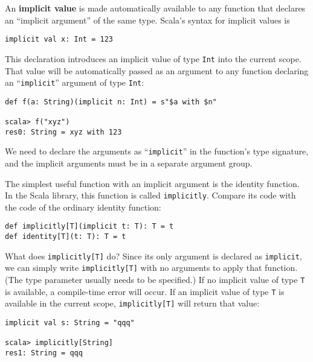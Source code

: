 An \textbf{implicit value} is made automatically
available to any function that declares an ``implicit argument''
of the same type. Scala's syntax for implicit values is
\begin{lstlisting}
implicit val x: Int = 123
\end{lstlisting}
This declaration introduces an implicit value of type \lstinline!Int!
into the current scope. That value will be automatically passed as
an argument to any function declaring an ``\lstinline!implicit!''
argument of type \lstinline!Int!:
\begin{lstlisting}
def f(a: String)(implicit n: Int) = s"$a with $n"

scala> f("xyz")
res0: String = xyz with 123
\end{lstlisting}
We need to declare the arguments as ``\lstinline!implicit!'' in
the function's type signature, and the implicit arguments must be
in a separate argument group.

The simplest useful function with an implicit argument is the identity
function. In the Scala library, this function is called \lstinline!implicitly!.
Compare its code with the code of the ordinary identity function:
\begin{lstlisting}
def implicitly[T](implicit t: T): T = t
def identity[T](t: T): T = t
\end{lstlisting}
What does \lstinline!implicitly[T]! do? Since its only argument is
declared as \lstinline!implicit!, we can simply write \lstinline!implicitly[T]!
with no arguments to apply that function. (The type parameter usually
needs to be specified.) If no implicit value of type \lstinline!T!
is available, a compile-time error will occur. If an implicit value
of type \lstinline!T! is available in the current scope, \lstinline!implicitly[T]!
will return that value:
\begin{lstlisting}
implicit val s: String = "qqq"

scala> implicitly[String]
res1: String = qqq
\end{lstlisting}

